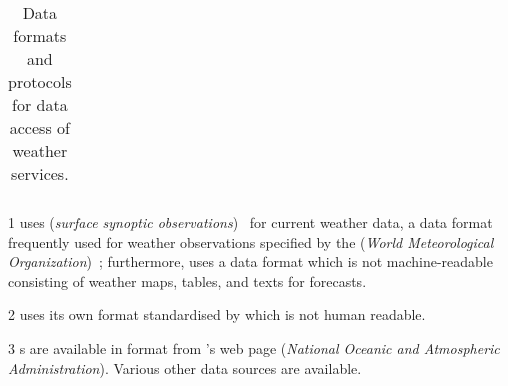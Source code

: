 \begin{table}
\begin{threeparttable}[b]
\begin{tabular}{|l||l|l|l|l|l|l||l|l|l|l|l|}
  \hline
\end{tabular}
\begin{tablenotes}
\item[1]  uses  (\emph{surface synoptic observations})~\cite{SYNOP} for current weather data, a data format frequently used for weather observations specified by the  (\emph{World Meteorological Organization})~\cite{WMO}; furthermore,  uses a data format which is not machine-readable consisting of weather maps, tables, and texts for forecasts.
\item[2]  uses its own format standardised by  which is not human readable.
\item[3] s are available in  format from 's web page (\emph{National Oceanic and Atmospheric Administration}). Various other data sources are available.
\end{tablenotes}
\end{threeparttable}
\caption{Data formats and protocols for data access of weather services.}
\label{table:weather_data3}
\end{table}
  
